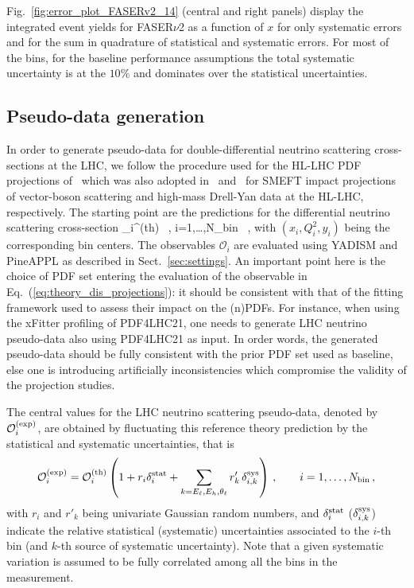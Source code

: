  Fig.~\ref{fig:error_plot_FASERv2_14} (central and right panels) display
 the integrated event yields for FASER$\nu$2 as a function of $x$ for only
 systematic errors and for the sum in quadrature of statistical and systematic errors.
 For most of the bins, for the baseline performance assumptions the total systematic
 uncertainty is at the $10\%$ and dominates over the statistical uncertainties.
 
 \subsection{Pseudo-data generation}

 In order to generate pseudo-data for double-differential
 neutrino scattering cross-sections at the LHC, we follow the procedure
 used for the HL-LHC PDF projections of~\cite{AbdulKhalek:2018rok} which was
 also adopted in~\cite{Ethier:2021ydt} and~\cite{Greljo:2021kvv} for SMEFT impact projections
 of vector-boson scattering and high-mass Drell-Yan data at the HL-LHC, respectively.
 The starting point are the predictions for the differential neutrino scattering
 cross-section
 \be
 \label{eq:theory_dis_projections}
 _i^{{\rm (th)}} \equiv {} \, ,\quad
 i=1,\ldots,N_{\rm bin} \, ,
 \ee
 with $(x_i,Q^2_i,y_i)$ being the corresponding bin centers.
 The observables $\mathcal{O}_i $ are evaluated using {\sc\small YADISM} and {\sc\small PineAPPL}
 as described in Sect.~\ref{sec:settings}.
 An important point here is the choice of PDF set entering the evaluation of
 the observable in Eq.~(\ref{eq:theory_dis_projections}): it should be consistent
 with that of the fitting framework used to assess their impact on the (n)PDFs.
 For instance, when using the {\sc\small xFitter} profiling of PDF4LHC21, one needs
 to generate LHC neutrino pseudo-data also using PDF4LHC21 as input.
 In order words, the generated pseudo-data should be fully consistent with the prior PDF
 set used as baseline, else one is introducing artificially inconsistencies which
 compromise the validity of the projection studies.
 
 The central values for the LHC neutrino scattering pseudo-data, denoted
 by $\mathcal{O}_i^{{\rm (exp)}} $, are obtained
 by fluctuating this reference theory prediction by the statistical and systematic
 uncertainties, that is
 \begin{equation}
  \label{eq:pseudo_data}
  \mathcal{O}_i^{{\rm (exp)}}
  =   \mathcal{O}_i^{{\rm (th)}}\left( 1+ r_{i} \delta_{i}^{\rm stat}
  + \sum_{k=E_\ell, E_h,\theta_\ell}
    r'_{k} \,\delta_{i,k}^{{\rm sys}}\right) \, , \qquad i=1,\ldots,N_{\rm bin} \, ,
 \end{equation}
 with $r_{i}$ and $r'_{k}$ being univariate Gaussian random numbers,
 and $\delta_i^{\rm stat}$ ($\delta_{i,k}^{\rm sys}$) indicate the relative statistical (systematic)
 uncertainties associated to the $i$-th bin (and $k$-th source of systematic uncertainty).
 Note that a given systematic variation is assumed to be fully correlated among all the bins
 in the measurement.

